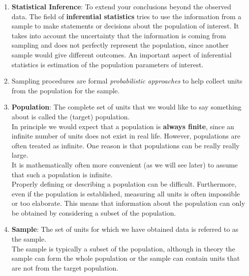 \begin{enumerate}
    \item \textbf{Statistical Inference}\label{Sampling Plans/Statistical Inference}: To extend your conclusions beyond the observed data.
    The field of \textbf{inferential statistics} tries to use the information from a sample to make statements or decisions about the population of interest.
    It takes into account the uncertainty that the information is coming from sampling and does not perfectly represent the population, since another sample would give different outcomes.
    An important aspect of inferential statistics is estimation of the population parameters of interest.
    \hfill \cite{statistics/book/Statistics-for-Data-Scientists/Maurits-Kaptein}

    \item Sampling procedures are formal \textit{probabilistic approaches} to help collect units from the population for the sample.
    \hfill \cite{statistics/book/Statistics-for-Data-Scientists/Maurits-Kaptein}

    \item \textbf{Population}\label{Sampling Plans/Population}: The complete set of units that we would like to say something about is called the (target) population.
    \hfill \cite{statistics/book/Statistics-for-Data-Scientists/Maurits-Kaptein}
    \\
    In principle we would expect that a population is \textbf{always finite}, since an infinite number of units does not exist in real life. However, populations are often treated as infinite. One reason is that populations can be really really large.
    \hfill \cite{statistics/book/Statistics-for-Data-Scientists/Maurits-Kaptein}
    \\
    It is mathematically often more convenient (as we will see later) to assume that such a population is infinite.
    \hfill \cite{statistics/book/Statistics-for-Data-Scientists/Maurits-Kaptein}
    \\
    Properly defining or describing a population can be difficult. Furthermore, even if the population is established, measuring all units is often impossible or too elaborate. This means that information about the population can only be obtained by considering a subset of the population.
    \hfill \cite{statistics/book/Statistics-for-Data-Scientists/Maurits-Kaptein}

    \item \textbf{Sample}\label{Sampling Plans/Sample}: The set of units for which we have obtained data is referred to as the sample.
    \hfill \cite{statistics/book/Statistics-for-Data-Scientists/Maurits-Kaptein}
    \\
    The sample is typically a subset of the population, although in theory the sample can form the whole population or the sample can contain units that are not from the target population.
    \hfill \cite{statistics/book/Statistics-for-Data-Scientists/Maurits-Kaptein}


\end{enumerate}
